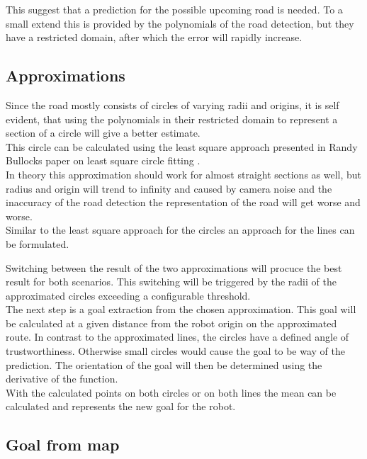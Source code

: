 This suggest that a prediction for the possible upcoming road is needed. To a small extend this is provided by the polynomials of the road detection, but they have a restricted domain, after which the error will rapidly increase.

\subsection{Approximations}

Since the road mostly consists of circles of varying radii and origins, it is self evident, that using the polynomials in their restricted domain to represent a section of a circle will give a better estimate.\\
This circle can be calculated using the least square approach presented in Randy Bullocks paper on least square circle fitting \cite{leastsquarecircle}.\\

In theory this approximation should work for almost straight sections as well, but radius and origin will trend to infinity and caused by camera noise and the inaccuracy of the road detection the representation of the road will get worse and worse.\\

Similar to the least square approach for the circles an approach for the lines can be formulated.

Switching between the result of the two approximations will procuce the best result for both scenarios. This switching will be triggered by the radii of the approximated circles exceeding a configurable threshold.\\

The next step is a goal extraction from the chosen approximation. This goal will be calculated at a given distance from the robot origin on the approximated route. In contrast to the approximated lines, the circles have a defined angle of trustworthiness. Otherwise small circles would cause the goal to be way of the prediction. The orientation of the goal will then be determined using the derivative of the function.\\

With the calculated points on both circles or on both lines the mean can be calculated and represents the new goal for the robot.

\subsection{Goal from map}

